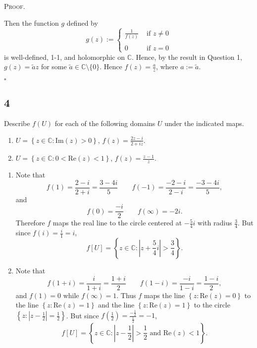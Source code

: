 \documentclass[12pt]{article}
\newcounter{ProofCounter}
\newenvironment{Proof}{\stepcounter{ProofCounter}\textsc{Proof.}}{\hfill$\square$}
\begin{document}
\begin{Proof}
\begin{description}
      Then the function $g$ defined by
      \[
        g(z) := \left\{ \begin{array}{cl}
            \frac{1}{f(z)} & \text{ if } z \neq 0 \\
            \\
            0 & \text{ if } z = 0
        \end{array} \right.
      \]
      is well-defined, 1-1, and holomorphic on $\mathbb{C}$. %
      Hence, by the result in Question 1, $g(z) = \tilde{a}z$ for some $\tilde{a} \in \mathbb{C}\setminus\{0\}$. Hence $f(z) = \frac{a}{z}$, 
      where $a := \tilde{a}$.
  \end{description}
\end{Proof}


\newpage
\subsection*{4}
\begin{tcolorbox}
  Describe $f(U)$ for each of the following domains $U$ under the indicated maps.
  \begin{enumerate}[label = (\alph*)]
    \item $U = \left\{ z \in \mathbb{C} : \text{Im}(z) > 0 \right\}$, $f(z) = \frac{2z - i}{2 + iz}$.
    \item $U = \left\{ z \in \mathbb{C} : 0 < \text{Re}(z) < 1 \right\}$, $f(z) = \frac{z - 1}{z}$.
  \end{enumerate}
\end{tcolorbox}
\begin{enumerate}[label = (\alph*)]
  \item Note that 
    \[ f(1) = \frac{2 - i}{2 + i} = \frac{3 - 4i}{5} \qquad f(-1) = \frac{-2 - i}{2 - i} = \frac{-3 - 4i}{5}, \]
    and 
    \[ f(0) = \frac{-i}{2} \qquad f(\infty) = -2i. \]
    Therefore $f$ maps the real line to the circle centered at $-\frac{5}{4}i$ with radius $\frac{3}{4}$. But since $f(i) = \frac{i}{1} = i$,
    \[ f[U] = \left\{ z \in \mathbb{C} : \left|z + \frac{5}{4}i\right| > \frac{3}{4} \right\}. \]
  \item Note that 
    \[ f(1 + i) = \frac{i}{1 + i} = \frac{1 + i}{2} \qquad f(1 - i) = \frac{-i}{1 - i} = \frac{1 - i}{2}, \]
    and $f(1) = 0$ while $f(\infty) = 1$. Thus $f$ maps the line $\left\{ z : \text{Re}(z) = 0 \right\}$ to the line $\left\{ z : \text{Re}(z) = 1
    \right\}$ and the line $\left\{ z : \text{Re}(z) = 1 \right\}$ to the circle $\left\{ z : \left|z - \frac{1}{2}\right| = \frac{1}{2} \right\}$.
    But since $f(\frac{1}{2}) = \frac{-\frac{1}{2}}{\frac{1}{2}} = -1$, 
    \[ f[U] = \left\{ z \in \mathbb{C} : \left|z - \frac{1}{2}\right| > \frac{1}{2} \text{ and } \text{Re}({z}) < 1 \right\}. \]
\end{enumerate}
\end{document}
